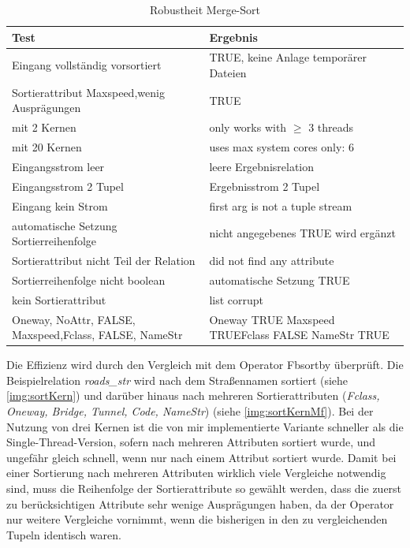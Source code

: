 \documentclass[a4paper,12pt,twoside]{article}
\newcommand{\Fb}[1]{\textit{#1}} %
\begin{document}
{\begin{table}
	\centering
	\begin{tabular}{|p{7.5cm}|p{7.5cm}|}
		\hline 
		Test & Ergebnis \\
		\hline
		Eingang vollständig vorsortiert & TRUE, keine Anlage temporärer Dateien \\
		\hline
		Sortierattribut Maxspeed,\newline wenig Ausprägungen & TRUE  \\
		\hline
		mit 2 Kernen & only works with $\geq$ 3 threads  \\ 
		\hline
		mit 20 Kernen & uses max system cores only: 6 \\ 
		\hline
		Eingangsstrom leer & leere Ergebnisrelation \\ 
		\hline
		Eingangsstrom 2 Tupel & Ergebnisstrom 2 Tupel \\ 
		\hline
		Eingang kein Strom & first arg is not a tuple stream \\ 
		\hline
		automatische Setzung Sortierreihenfolge & nicht angegebenes TRUE wird ergänzt \\ 
		\hline
		Sortierattribut nicht Teil der Relation & did not find any attribute \\ 
		\hline
		Sortierreihenfolge nicht boolean & automatische Setzung TRUE \\ 
		\hline
		kein Sortierattribut & list corrupt \\
		\hline
		Oneway, NoAttr, FALSE, Maxspeed,\newline Fclass, FALSE, NameStr &  Oneway TRUE Maxspeed TRUE\newline Fclass FALSE NameStr TRUE \\
		\hline
\end{tabular}
	\caption{\label{tab:testSortRobust}Robustheit Merge-Sort}
\end{table}

Die Effizienz wird durch den Vergleich mit dem Operator Fb{sortby} überprüft. Die Beispielrelation \Fb{roads\_str} wird nach dem Straßennamen sortiert (siehe \autoref{img:sortKern}) und darüber hinaus nach mehreren Sortierattributen (\Fb{Fclass, Oneway, Bridge, Tunnel, Code, NameStr}) (siehe \autoref{img:sortKernMf}). Bei der Nutzung von drei Kernen ist die von mir implementierte Variante schneller als die Single-Thread-Version, sofern nach mehreren Attributen sortiert wurde, und ungefähr gleich schnell, wenn nur nach einem Attribut sortiert wurde. Damit bei einer Sortierung nach mehreren Attributen wirklich viele Vergleiche notwendig sind, muss die Reihenfolge der Sortierattribute so gewählt werden, dass die zuerst zu berücksichtigen Attribute sehr wenige Ausprägungen haben, da der Operator nur weitere Vergleiche vornimmt, wenn die bisherigen in den zu vergleichenden Tupeln identisch waren.   

}
\end{document}
